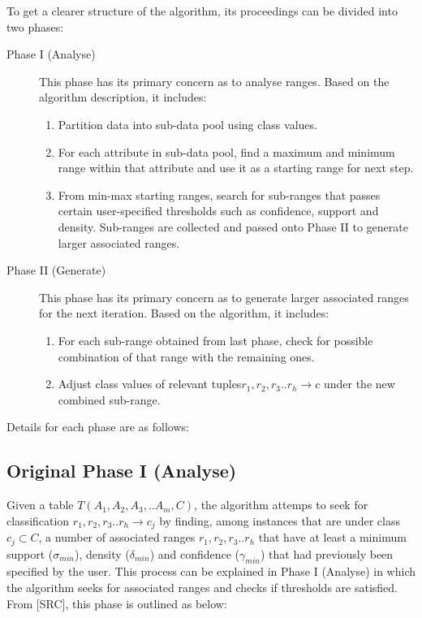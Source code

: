 To get a clearer structure of the algorithm, its proceedings can be divided into two phases:  

\begin{description}
\item[Phase I (Analyse)] 
This phase has its primary concern as to analyse ranges. Based on the algorithm description, it includes:
	\begin{enumerate}
	\item Partition data into sub-data pool using class values.
	\item For each attribute in sub-data pool, find a maximum and minimum range within that attribute and use it as a starting range for next step.
	\item From min-max starting ranges, search for sub-ranges that passes certain user-specified thresholds such as confidence, support and density. Sub-ranges are collected and passed onto Phase II to generate larger associated ranges.
	\end{enumerate}

\item[Phase II (Generate)] 
This phase has its primary concern as to generate larger associated ranges for the next iteration. Based on the algorithm, it includes:
	\begin{enumerate}
	\item For each sub-range obtained from last phase, check for possible combination of that range with the remaining ones.
	\item Adjust class values of relevant tuples$r_1, r_2, r_3..r_h \rightarrow c$ under the new combined sub-range.
	\end{enumerate}
\end{description}

Details for each phase are as follows:

\subsection{Original Phase I (Analyse)}

Given a table $T(A_1, A_2, A_3,..A_m, C)$, the algorithm attemps to seek for classification $r_1, r_2, r_3..r_h \rightarrow c_j$ by finding, among instances that are under class $c_j \subset C$, a number of associated ranges $r_1, r_2, r_3..r_h$ that have at least a minimum support ($\sigma_{min}$), density ($\delta_{min}$) and confidence ($\gamma_{min}$) that had previously been specified by the user. This process can be explained in Phase I (Analyse) in which the algorithm seeks for associated ranges and checks if thresholds are satisfied. From [SRC], this phase is outlined as below:

